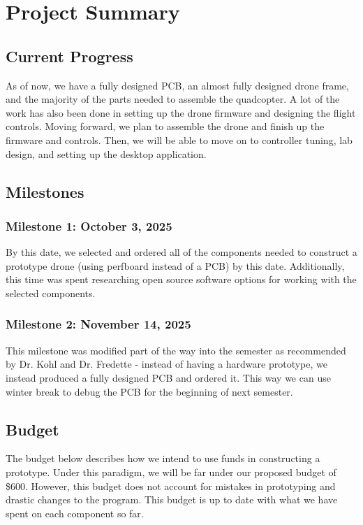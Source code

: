 \documentclass[12pt, titlepage]{article}
\begin{document}
\section{Project Summary}

\subsection{Current Progress}

As of now, we have a fully designed PCB, an almost fully designed drone frame, and the majority of the parts needed to assemble the quadcopter. A lot of the work has also been done in setting up the drone firmware and designing the flight controls. Moving forward, we plan to assemble the drone and finish up the firmware and controls. Then, we will be able to move on to controller tuning, lab design, and setting up the desktop application.

\subsection{Milestones}

\subsubsection[October 3, 2025]{Milestone 1: October 3, 2025} By this date, we selected and ordered all of the components needed to construct a prototype drone (using perfboard instead of a PCB) by this date. Additionally, this time was spent researching open source software options for working with the selected components. 

\subsubsection[November 14, 2025]{Milestone 2: November 14, 2025} This milestone was modified part of the way into the semester as recommended by Dr. Kohl and Dr. Fredette - instead of having a hardware prototype, we instead produced a fully designed PCB and ordered it. This way we can use winter break to debug the PCB for the beginning of next semester.

\subsection{Budget}
The budget below describes how we intend to use funds in constructing a prototype. Under this paradigm, we will be far under our proposed budget of \$600. However, this budget does not account for mistakes in prototyping and drastic changes to the program. This budget is up to date with what we have spent on each component so far.
\end{document}
